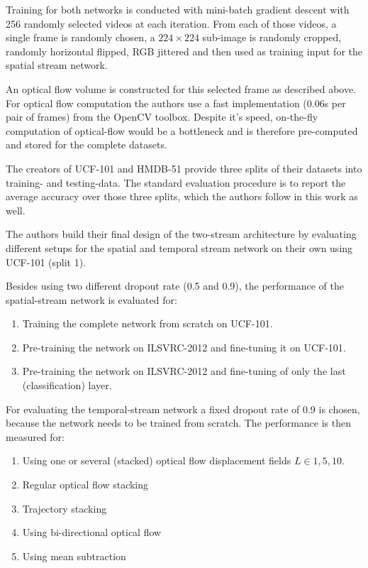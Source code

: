 Training for both networks is conducted with mini-batch gradient descent with 256 randomly selected videos at each iteration. From each of those videos, a single frame is randomly chosen, a $224 \times 224$ sub-image is randomly cropped, randomly horizontal flipped, RGB jittered and then used as training input for the spatial stream network.

An optical flow volume is constructed for this selected frame as described above. For optical flow computation the authors use a fast implementation (0.06s per pair of frames) from the OpenCV toolbox. Despite it's speed, on-the-fly computation of optical-flow would be a bottleneck and is therefore pre-computed and stored for the complete datasets.

The creators of UCF-101 and HMDB-51 provide three splits of their datasets into training- and testing-data. The standard evaluation procedure is to report the average accuracy over those three splits, which the authors follow in this work as well.

The authors build their final design of the two-stream architecture by evaluating different setups for the spatial and temporal stream network on their own using UCF-101 (split 1).

Besides using two different dropout rate (0.5 and 0.9), the performance of the spatial-stream network is evaluated for:
\begin{enumerate}
    \item Training the complete network from scratch on UCF-101.
    \item Pre-training the network on ILSVRC-2012 and fine-tuning it on UCF-101.
    \item Pre-training the network on ILSVRC-2012 and fine-tuning of only the last (classification) layer.
\end{enumerate}

For evaluating the temporal-stream network a fixed dropout rate of 0.9 is chosen, because the network needs to be trained from scratch. The performance is then measured for:
\begin{enumerate}
    \item Using one or several (stacked) optical flow displacement fields $L \in {1,5,10}$.
    \item Regular optical flow stacking
    \item Trajectory stacking
    \item Using bi-directional optical flow
    \item Using mean subtraction
\end{enumerate}

